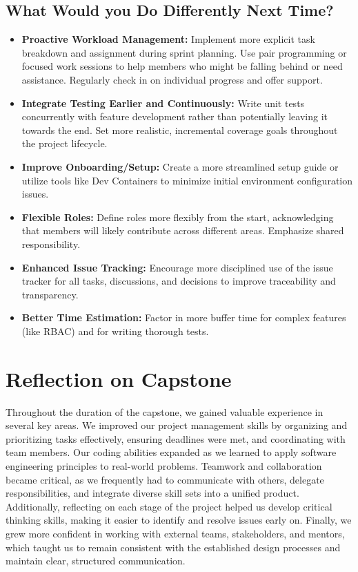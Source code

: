 \documentclass{article}
\begin{document}
\subsection{What Would you Do Differently Next Time?}

\begin{itemize}
  \item \textbf{Proactive Workload Management:} Implement more explicit task breakdown and assignment during sprint planning. Use pair programming or focused work sessions to help members who might be falling behind or need assistance. Regularly check in on individual progress and offer support.
  \item \textbf{Integrate Testing Earlier and Continuously:} Write unit tests concurrently with feature development rather than potentially leaving it towards the end. Set more realistic, incremental coverage goals throughout the project lifecycle.
  \item \textbf{Improve Onboarding/Setup:} Create a more streamlined setup guide or utilize tools like Dev Containers to minimize initial environment configuration issues.
  \item \textbf{Flexible Roles:} Define roles more flexibly from the start, acknowledging that members will likely contribute across different areas. Emphasize shared responsibility.
  \item \textbf{Enhanced Issue Tracking:} Encourage more disciplined use of the issue tracker for all tasks, discussions, and decisions to improve traceability and transparency.
  \item \textbf{Better Time Estimation:} Factor in more buffer time for complex features (like RBAC) and for writing thorough tests.
\end{itemize}

\section{Reflection on Capstone}

Throughout the duration of the capstone, we gained valuable experience in several key areas. We improved our project management skills by organizing and prioritizing tasks effectively, ensuring deadlines were met, and coordinating with team members. Our coding abilities expanded as we learned to apply software engineering principles to real-world problems. Teamwork and collaboration became critical, as we frequently had to communicate with others, delegate responsibilities, and integrate diverse skill sets into a unified product. Additionally, reflecting on each stage of the project helped us develop critical thinking skills, making it easier to identify and resolve issues early on. Finally, we grew more confident in working with external teams, stakeholders, and mentors, which taught us to remain consistent with the established design processes and maintain clear, structured communication.
\end{document}
